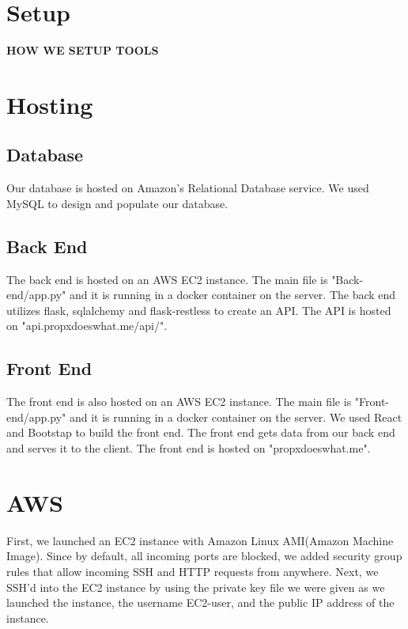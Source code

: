 \documentclass[12pt]{article}
\begin{document}
\section{Setup}

\textbf{HOW WE SETUP TOOLS}

\section{Hosting}

\subsection{Database}

Our database is hosted on Amazon's Relational Database service. We used MySQL to design and populate our database.

\subsection{Back End}

The back end is hosted on an AWS EC2 instance. The main file is "Back-end/app.py" and it is running in a docker container on the server. The back end utilizes flask, sqlalchemy and flask-restless to create an API. The API is hosted on "api.propxdoeswhat.me/api/".

\subsection{Front End}

The front end is also hosted on an AWS EC2 instance. The main file is "Front-end/app.py" and it is running in a docker container on the server. We used React and Bootstap to build the front end. The front end gets data from our back end and serves it to the client. The front end is hosted on "propxdoeswhat.me".

\section{AWS}

First, we launched an EC2 instance with Amazon Linux AMI(Amazon Machine Image). Since by default, all incoming ports are blocked, we added security group rules that allow incoming SSH and HTTP requests from anywhere. Next, we SSH'd into the EC2 instance by using the private key file we were given as we launched the instance, the username EC2-user, and the public IP address of the instance. \\
\end{document}
